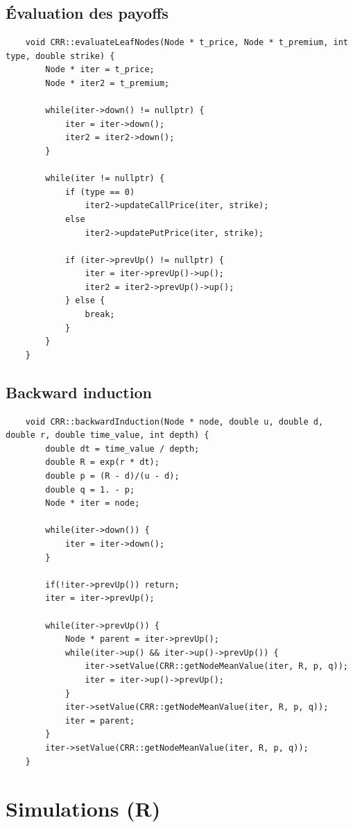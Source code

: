 \subsection*{Évaluation des payoffs}
\begin{lstlisting}
    void CRR::evaluateLeafNodes(Node * t_price, Node * t_premium, int type, double strike) {
        Node * iter = t_price;
        Node * iter2 = t_premium;
    
        while(iter->down() != nullptr) {
            iter = iter->down();
            iter2 = iter2->down();
        }
    
        while(iter != nullptr) {
            if (type == 0)
                iter2->updateCallPrice(iter, strike);
            else
                iter2->updatePutPrice(iter, strike);
    
            if (iter->prevUp() != nullptr) {
                iter = iter->prevUp()->up();
                iter2 = iter2->prevUp()->up();
            } else {
                break;
            }
        }
    }
\end{lstlisting}
\pagebreak
\subsection*{Backward induction}
\begin{lstlisting}
    void CRR::backwardInduction(Node * node, double u, double d, double r, double time_value, int depth) {
        double dt = time_value / depth;
        double R = exp(r * dt);
        double p = (R - d)/(u - d);
        double q = 1. - p;
        Node * iter = node;
    
        while(iter->down()) {
            iter = iter->down();
        }
    
        if(!iter->prevUp()) return;
        iter = iter->prevUp();
    
        while(iter->prevUp()) {
            Node * parent = iter->prevUp();
            while(iter->up() && iter->up()->prevUp()) {
                iter->setValue(CRR::getNodeMeanValue(iter, R, p, q));
                iter = iter->up()->prevUp();
            }
            iter->setValue(CRR::getNodeMeanValue(iter, R, p, q));
            iter = parent;
        }
        iter->setValue(CRR::getNodeMeanValue(iter, R, p, q));
    }
\end{lstlisting}

\section*{Simulations (R)}
